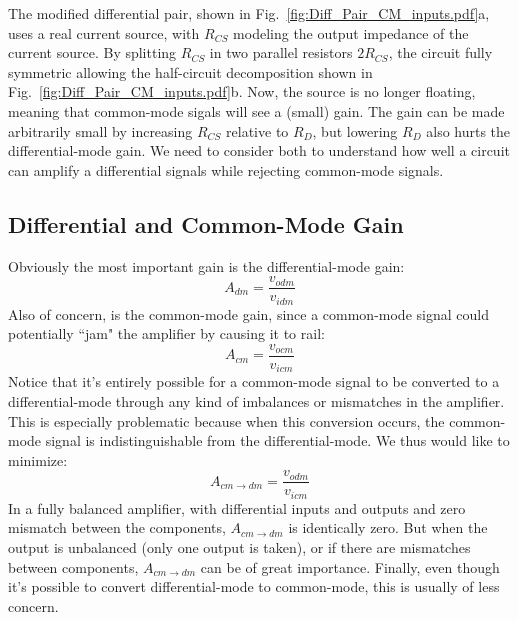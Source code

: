 The modified differential pair, shown in Fig.~\ref{fig:Diff_Pair_CM_inputs.pdf}a, uses a real current source, with $R_{CS}$ modeling the output impedance of the current source.  By splitting $R_{CS}$ in two parallel resistors $2R_{CS}$, the circuit fully symmetric allowing the half-circuit decomposition shown in Fig.~\ref{fig:Diff_Pair_CM_inputs.pdf}b.  Now, the source is no longer floating, meaning that common-mode sigals will see a (small) gain.  The gain can be made arbitrarily small by increasing $R_{CS}$ relative to $R_D$, but lowering $R_D$ also hurts the differential-mode gain.  We need to consider both to understand how well a circuit can amplify a differential signals while rejecting common-mode signals.
\subsection{Differential and Common-Mode Gain}
Obviously the most important gain is the differential-mode gain:
    \begin{equation}
        A_{dm} = \frac{v_{odm}}{v_{idm}}
    \end{equation}
Also of concern, is the common-mode gain, since a common-mode signal could potentially ``jam" the amplifier by causing it to rail:
    \begin{equation}
        A_{cm} = \frac{v_{ocm}}{v_{icm}}
    \end{equation}
Notice that it's entirely possible for a common-mode signal to be converted to a differential-mode through any kind of imbalances or mismatches in the amplifier.  This is especially problematic because when this conversion occurs, the common-mode signal is indistinguishable from the differential-mode.  We thus would like to minimize:
    \begin{equation}
        A_{cm \to dm} = \frac{v_{odm}}{v_{icm}}
    \end{equation}
In a fully balanced amplifier, with differential inputs and outputs and zero mismatch between the components, $A_{cm \to dm}$ is identically zero.  But when the output is unbalanced (only one output is taken), or if there are mismatches between components, $A_{cm \to dm}$ can be of great importance.  Finally, even though it's possible to convert differential-mode to common-mode, this is usually of less concern.  

